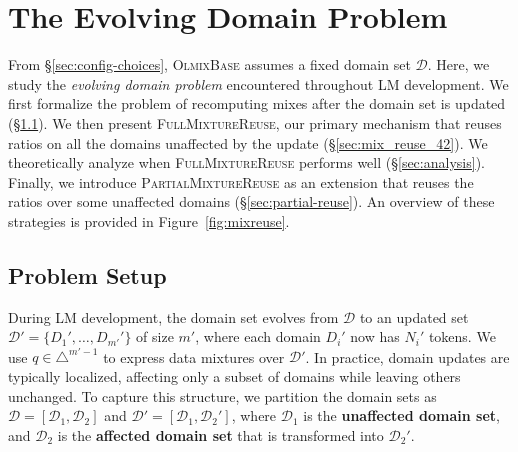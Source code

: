 \documentclass[table]{ai2style/ai2}
\newcommand{\D}[0]{\mathcal{D}}
\newcommand{\base}[0]{\textsc{OlmixBase}\xspace}
\newcommand{\fullmixreuse}[0]{\textsc{FullMixtureReuse}\xspace}
\newcommand{\partialmixreuse}[0]{\textsc{PartialMixtureReuse}\xspace}
\begin{document}
\section{The Evolving Domain Problem}\label{sec:conditional_mixing}

From \S\ref{sec:config-choices}, \base assumes a fixed domain set $\D$. Here, we study the \emph{evolving domain problem} encountered throughout LM development.
We first formalize the problem of recomputing mixes after the domain set is updated (\S\ref{sec:problem-setup-evolving-domain}). We then present \fullmixreuse, our primary mechanism that reuses ratios on all the domains unaffected by the update (\S\ref{sec:mix_reuse_42}). We theoretically analyze when \fullmixreuse performs well (\S\ref{sec:analysis}). Finally, we introduce \partialmixreuse as an extension that reuses the ratios over some unaffected domains (\S\ref{sec:partial-reuse}). An overview of these strategies is provided in Figure~\ref{fig:mixreuse}.

\subsection{Problem Setup}
\label{sec:problem-setup-evolving-domain}

During LM development, the domain set evolves from $\D$ to an updated set $\D' = \{D_1', \dots, D_{m'}'\}$ of size $m'$, where each domain $D_i'$ now has $N_i'$ tokens. We use $q \in \triangle^{m'-1}$ to express data mixtures over $\D'$.
In practice, domain updates are typically localized, affecting only a subset of domains while leaving others unchanged.
To capture this structure, we partition the domain sets as $\D = [\D_1, \D_2]$ and $\D' = [\D_1, \D_2']$, where $\D_1$ is the \textbf{unaffected domain set}, and $\D_2$ is the \textbf{affected domain set} that is transformed into $\D_2'$.
\end{document}
